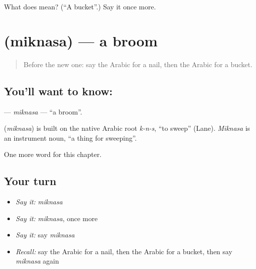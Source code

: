 \begin{tcolorbox}[breakable,colback=teal!4,colframe=teal!35!black,title={Before you move on}]
What does  mean? (\textquotedblleft{}A bucket\textquotedblright{}.) Say it once more.
\end{tcolorbox}
\section[\texorpdfstring{\ar{مكنسة} (miknasa)}{مكنسة (miknasa)}]{ (miknasa) — a broom}

\label{lesson:AR-C125-miknasa}



\begin{quote}
Before the new one: say the Arabic for a nail, then the Arabic for a bucket.
\end{quote}

\subsection*{You'll want to know: }
\textbf{} — \emph{miknasa} — \textquotedblleft{}a broom\textquotedblright{}.

\begin{cousinweb}
\textbf{} (\emph{miknasa}) is built on the native Arabic root \emph{k-n-s}, \textquotedblleft{}to sweep\textquotedblright{} (Lane). \emph{Miknasa} is an instrument noun, \textquotedblleft{}a thing for sweeping\textquotedblright{}.
\end{cousinweb}

\begin{grammarlens}[title={What you've built}]
One more word for this chapter.
\end{grammarlens}

\subsection*{Your turn}
\begin{itemize}
\raggedright
  \item \emph{Say it:} \emph{miknasa}
  \item \emph{Say it:} \emph{miknasa}, once more
  \item \emph{Say it:} say \emph{miknasa}
  \item \emph{Recall:} say the Arabic for a nail, then the Arabic for a bucket, then say \emph{miknasa} again
\end{itemize}

